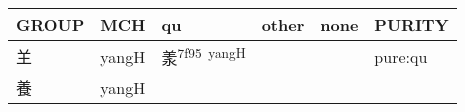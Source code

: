 \documentclass[14pt,a4paper]{scrartcl}
\begin{document}
\begin{longtable}[c]{@{}llllll@{}}
\toprule
\begin{minipage}[b]{0.14\columnwidth}\raggedright\strut
GROUP
\strut\end{minipage} &
\begin{minipage}[b]{0.14\columnwidth}\raggedright\strut
MCH
\strut\end{minipage} &
\begin{minipage}[b]{0.14\columnwidth}\raggedright\strut
qu
\strut\end{minipage} &
\begin{minipage}[b]{0.14\columnwidth}\raggedright\strut
other
\strut\end{minipage} &
\begin{minipage}[b]{0.14\columnwidth}\raggedright\strut
none
\strut\end{minipage} &
\begin{minipage}[b]{0.14\columnwidth}\raggedright\strut
PURITY
\strut\end{minipage}\tabularnewline
\midrule
\endhead
\begin{minipage}[t]{0.14\columnwidth}\raggedright\strut
𦍌
\strut\end{minipage} &
\begin{minipage}[t]{0.14\columnwidth}\raggedright\strut
yangH
\strut\end{minipage} &
\begin{minipage}[t]{0.14\columnwidth}\raggedright\strut
羕\textsuperscript{7f95~yangH}
\strut\end{minipage} &
\begin{minipage}[t]{0.14\columnwidth}\raggedright\strut
\strut\end{minipage} &
\begin{minipage}[t]{0.14\columnwidth}\raggedright\strut
\strut\end{minipage} &
\begin{minipage}[t]{0.14\columnwidth}\raggedright\strut
pure:qu
\strut\end{minipage}\tabularnewline
\begin{minipage}[t]{0.14\columnwidth}\raggedright\strut
養
\strut\end{minipage} &
\begin{minipage}[t]{0.14\columnwidth}\raggedright\strut
yangH
\strut\end{minipage} &
\begin{minipage}[t]{0.14\columnwidth}\raggedright\strut
\strut\end{minipage} &

\end{longtable}
\end{document}
